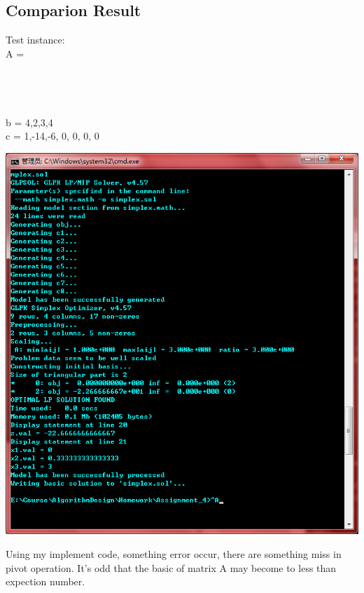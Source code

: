 \documentclass{article}
\numberwithin{equation}{section}
\begin{document}
\subsection{Comparion Result}
Test instance:\\
A = \\
                 [1, 1, 1, 1, 0, 0, 0]\\
                 [1, 0, 0, 0, 1, 0, 0]\\
                 [0, 0, 1, 0, 0, 1, 0]\\
                 [0, 3, 1, 0, 0, 0, 1]\\
b = 4,2,3,4 \\
c = 1,-14,-6, 0, 0, 0, 0 \\
\begin{center}
    \includegraphics[width=0.75\columnwidth]{simplexresult} %
\end{center}
Using my implement code, something error occur, there are something miss in pivot operation. It's odd that the basic of matrix A may become to less than expection number.
\end{document}
